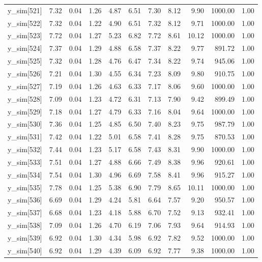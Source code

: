 \begin{table}[ht]
\begin{tabular}{rrrrrrrrrrr}
  y\_sim[521] & 7.32 & 0.04 & 1.26 & 4.87 & 6.51 & 7.30 & 8.12 & 9.90 & 1000.00 & 1.00 \\ 
  y\_sim[522] & 7.32 & 0.04 & 1.22 & 4.90 & 6.51 & 7.32 & 8.12 & 9.71 & 1000.00 & 1.00 \\ 
  y\_sim[523] & 7.72 & 0.04 & 1.27 & 5.23 & 6.82 & 7.72 & 8.61 & 10.12 & 1000.00 & 1.00 \\ 
  y\_sim[524] & 7.37 & 0.04 & 1.29 & 4.88 & 6.58 & 7.37 & 8.22 & 9.77 & 891.72 & 1.00 \\ 
  y\_sim[525] & 7.32 & 0.04 & 1.28 & 4.76 & 6.47 & 7.34 & 8.22 & 9.74 & 945.06 & 1.00 \\ 
  y\_sim[526] & 7.21 & 0.04 & 1.30 & 4.55 & 6.34 & 7.23 & 8.09 & 9.80 & 910.75 & 1.00 \\ 
  y\_sim[527] & 7.19 & 0.04 & 1.26 & 4.63 & 6.33 & 7.17 & 8.06 & 9.60 & 1000.00 & 1.00 \\ 
  y\_sim[528] & 7.09 & 0.04 & 1.23 & 4.72 & 6.31 & 7.13 & 7.90 & 9.42 & 899.49 & 1.00 \\ 
  y\_sim[529] & 7.18 & 0.04 & 1.27 & 4.79 & 6.33 & 7.16 & 8.04 & 9.64 & 1000.00 & 1.00 \\ 
  y\_sim[530] & 7.36 & 0.04 & 1.25 & 4.85 & 6.50 & 7.40 & 8.23 & 9.75 & 987.79 & 1.00 \\ 
  y\_sim[531] & 7.42 & 0.04 & 1.22 & 5.01 & 6.58 & 7.41 & 8.28 & 9.75 & 870.53 & 1.00 \\ 
  y\_sim[532] & 7.44 & 0.04 & 1.23 & 5.17 & 6.58 & 7.43 & 8.31 & 9.90 & 1000.00 & 1.00 \\ 
  y\_sim[533] & 7.51 & 0.04 & 1.27 & 4.88 & 6.66 & 7.49 & 8.38 & 9.96 & 920.61 & 1.00 \\ 
  y\_sim[534] & 7.54 & 0.04 & 1.30 & 4.96 & 6.69 & 7.58 & 8.41 & 9.96 & 915.27 & 1.00 \\ 
  y\_sim[535] & 7.78 & 0.04 & 1.25 & 5.38 & 6.90 & 7.79 & 8.65 & 10.11 & 1000.00 & 1.00 \\ 
  y\_sim[536] & 6.69 & 0.04 & 1.29 & 4.24 & 5.81 & 6.64 & 7.57 & 9.20 & 950.57 & 1.00 \\ 
  y\_sim[537] & 6.68 & 0.04 & 1.23 & 4.18 & 5.88 & 6.70 & 7.52 & 9.13 & 932.41 & 1.00 \\ 
  y\_sim[538] & 7.09 & 0.04 & 1.26 & 4.70 & 6.19 & 7.06 & 7.93 & 9.64 & 914.93 & 1.00 \\ 
  y\_sim[539] & 6.92 & 0.04 & 1.30 & 4.34 & 5.98 & 6.92 & 7.82 & 9.52 & 1000.00 & 1.00 \\ 
  y\_sim[540] & 6.92 & 0.04 & 1.29 & 4.39 & 6.09 & 6.92 & 7.77 & 9.38 & 1000.00 & 1.00 \\ 

\end{tabular}
\end{table}

